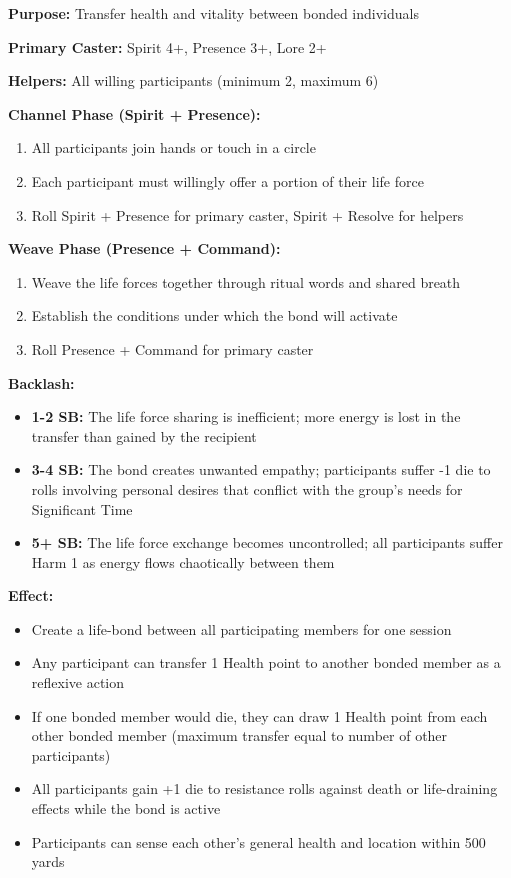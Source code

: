 \textbf{Purpose:} Transfer health and vitality between bonded individuals

\textbf{Primary Caster:} Spirit 4+, Presence 3+, Lore 2+

\textbf{Helpers:} All willing participants (minimum 2, maximum 6)

\textbf{Channel Phase (Spirit + Presence):}
\begin{enumerate}
\item All participants join hands or touch in a circle
\item Each participant must willingly offer a portion of their life force
\item Roll Spirit + Presence for primary caster, Spirit + Resolve for helpers
\end{enumerate}

\textbf{Weave Phase (Presence + Command):}
\begin{enumerate}
\item Weave the life forces together through ritual words and shared breath
\item Establish the conditions under which the bond will activate
\item Roll Presence + Command for primary caster
\end{enumerate}

\textbf{Backlash:}
\begin{itemize}
\item \textbf{1-2 SB:} The life force sharing is inefficient; more energy is lost in the transfer than gained by the recipient
\item \textbf{3-4 SB:} The bond creates unwanted empathy; participants suffer -1 die to rolls involving personal desires that conflict with the group's needs for Significant Time
\item \textbf{5+ SB:} The life force exchange becomes uncontrolled; all participants suffer Harm 1 as energy flows chaotically between them
\end{itemize}

\textbf{Effect:}
\begin{itemize}
\item Create a life-bond between all participating members for one session
\item Any participant can transfer 1 Health point to another bonded member as a reflexive action
\item If one bonded member would die, they can draw 1 Health point from each other bonded member (maximum transfer equal to number of other participants)
\item All participants gain +1 die to resistance rolls against death or life-draining effects while the bond is active
\item Participants can sense each other's general health and location within 500 yards
\end{itemize}

